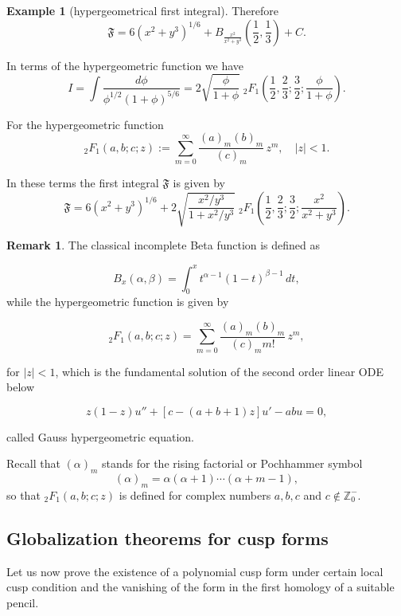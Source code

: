 \documentclass[11pt,a4paper]{amsart}
\theoremstyle{definition}
\newtheorem{example}[theorem]{Example}
\newtheorem{remark}[theorem]{Remark}
\begin{document}
\begin{example}[hypergeometrical first integral]
Therefore
\[
\mathfrak {F}
= 6(x^2+y^3)^{1/6}
+ B_{\frac{x^2}{x^2+y^3}}\!\left(\frac12,\frac13\right)+C.
\]

In terms of the hypergeometric function we have
\[
I
= \int \frac{d\phi}{\phi^{1/2}(1+\phi)^{5/6}}
= 2\sqrt{\frac{\phi}{1+\phi}}\;
{}_2F_1\!\left(\frac12,\frac23;\frac32;\frac{\phi}{1+\phi}\right).
\]

For the hypergeometric function
\[
{}_2F_1(a,b;c;z)
:= \sum_{m=0}^{\infty}
\frac{(a)_m(b)_m}{(c)_m}\,z^m,
\quad |z|<1.
\]


In these terms the first integral $\mathfrak {F}$ is given by
\[
\mathfrak {F}
= 6(x^2+y^3)^{1/6}
+ 2\sqrt{\frac{x^2/y^3}{1+x^2/y^3}}\;
{}_2F_1\!\left(\frac12,\frac23;\frac32;\frac{x^2}{x^2+y^3}\right).
\]


\bigskip





\end{example}


\begin{remark}{\rm 
The classical incomplete Beta function is defined as

\[
B_x(\alpha,\beta)
=
\int_0^x
t^{\alpha-1}(1-t)^{\beta-1}\,dt,
\]
while the hypergeometric function is given by

\[
{}_2F_1(a,b;c;z)
=
\sum_{m=0}^{\infty}
\frac{(a)_m(b)_m}{(c)_m m!}\,
z^m,
\]

for $|z|<1$, which is the fundamental solution
of the second order linear ODE below

\[
z(1-z)u''
+
[c-(a+b+1)z]u'
-
abu
=
0,
\]

called Gauss hypergeometric equation.



Recall that $(\alpha)_m$ stands for the rising factorial or Pochhammer symbol
\[
(\alpha)_m = \alpha(\alpha+1)\cdots(\alpha+m-1),
\]
so that ${}_2F_1(a,b;c;z)$ is defined for complex numbers $a,b,c$ and $c\notin\mathbb Z_0^{-}$.

}
\end{remark}



\subsection{Globalization theorems for cusp forms}


Let us now prove the existence of a polynomial cusp form under 
certain local cusp condition and the vanishing of the form in the 
first homology of a suitable pencil. 
\end{document}
